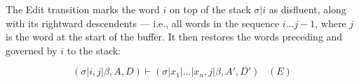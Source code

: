 \documentclass[11pt,letterpaper]{article}
\begin{document}
%
%
% 
%

The Edit transition marks the word $i$ on top of the stack $\sigma | i$ as
disfluent, along with its rightward descendents --- i.e., all words in the
sequence $i...j-1$, where $j$ is the word at the start of the buffer. It then
restores the words preceding and governed by $i$ to the stack:

\begin{equation}
    (\sigma | i, j | \beta, A, D) \vdash (\sigma | x_1 | ... | x_n, j | \beta,A',D')\;\;\;(E)
    \nonumber
\end{equation}
\end{document}
